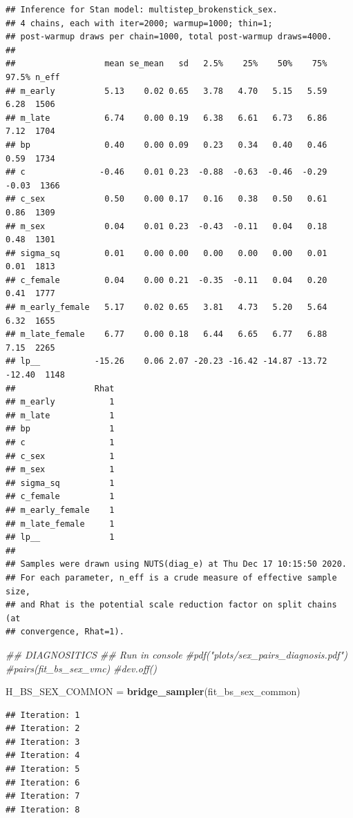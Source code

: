 \documentclass[
]{article}
\newenvironment{Shaded}{\begin{snugshade}}{\end{snugshade}}
\newcommand{\CommentTok}[1]{\textcolor[rgb]{0.56,0.35,0.01}{\textit{#1}}}
\newcommand{\KeywordTok}[1]{\textcolor[rgb]{0.13,0.29,0.53}{\textbf{#1}}}
\newcommand{\NormalTok}[1]{#1}
\newcommand{\StringTok}[1]{\textcolor[rgb]{0.31,0.60,0.02}{#1}}
\begin{document}
\begin{verbatim}
## Inference for Stan model: multistep_brokenstick_sex.
## 4 chains, each with iter=2000; warmup=1000; thin=1; 
## post-warmup draws per chain=1000, total post-warmup draws=4000.
## 
##                  mean se_mean   sd   2.5%    25%    50%    75%  97.5% n_eff
## m_early          5.13    0.02 0.65   3.78   4.70   5.15   5.59   6.28  1506
## m_late           6.74    0.00 0.19   6.38   6.61   6.73   6.86   7.12  1704
## bp               0.40    0.00 0.09   0.23   0.34   0.40   0.46   0.59  1734
## c               -0.46    0.01 0.23  -0.88  -0.63  -0.46  -0.29  -0.03  1366
## c_sex            0.50    0.00 0.17   0.16   0.38   0.50   0.61   0.86  1309
## m_sex            0.04    0.01 0.23  -0.43  -0.11   0.04   0.18   0.48  1301
## sigma_sq         0.01    0.00 0.00   0.00   0.00   0.00   0.01   0.01  1813
## c_female         0.04    0.00 0.21  -0.35  -0.11   0.04   0.20   0.41  1777
## m_early_female   5.17    0.02 0.65   3.81   4.73   5.20   5.64   6.32  1655
## m_late_female    6.77    0.00 0.18   6.44   6.65   6.77   6.88   7.15  2265
## lp__           -15.26    0.06 2.07 -20.23 -16.42 -14.87 -13.72 -12.40  1148
##                Rhat
## m_early           1
## m_late            1
## bp                1
## c                 1
## c_sex             1
## m_sex             1
## sigma_sq          1
## c_female          1
## m_early_female    1
## m_late_female     1
## lp__              1
## 
## Samples were drawn using NUTS(diag_e) at Thu Dec 17 10:15:50 2020.
## For each parameter, n_eff is a crude measure of effective sample size,
## and Rhat is the potential scale reduction factor on split chains (at 
## convergence, Rhat=1).
\end{verbatim}

\begin{Shaded}
\begin{Highlighting}[]
\CommentTok{## DIAGNOSITICS}
\CommentTok{## Run in console}
\CommentTok{#pdf("plots/sex_pairs_diagnosis.pdf")}
\CommentTok{#pairs(fit_bs_sex_vmc)}
\CommentTok{#dev.off()}

\NormalTok{H_BS_SEX_COMMON =}\StringTok{ }\KeywordTok{bridge_sampler}\NormalTok{(fit_bs_sex_common)}
\end{Highlighting}
\end{Shaded}

\begin{verbatim}
## Iteration: 1
## Iteration: 2
## Iteration: 3
## Iteration: 4
## Iteration: 5
## Iteration: 6
## Iteration: 7
## Iteration: 8
\end{verbatim}
\end{document}
